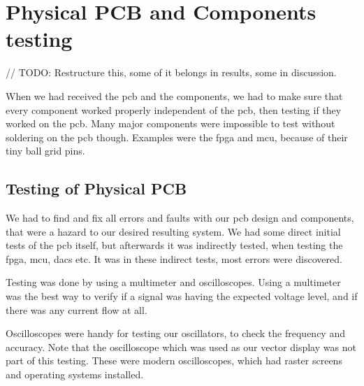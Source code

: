 \section{Physical PCB and Components testing}

// TODO: Restructure this, some of it belongs in results, some in discussion.

When we had received the \gls{pcb} and the components, we had to make sure that every component worked properly independent of the \gls{pcb}, then testing if they worked on the \gls{pcb}. Many major components were impossible to test without soldering on the \gls{pcb} though. Examples were the \gls{fpga} and \gls{mcu}, because of their tiny ball grid pins.

\subsection{Testing of Physical PCB}
We had to find and fix all errors and faults with our \gls{pcb} design and components, that were a hazard to our desired resulting system.  
We had some direct initial tests of the \gls{pcb} itself, but afterwards it was indirectly tested, when testing the \gls{fpga}, \gls{mcu}, \gls{dac}s etc. It was in these indirect tests, most errors were discovered.

Testing was done by using a multimeter and oscilloscopes. Using a multimeter was the best way to verify if a signal was having the expected voltage level, and if there was any current flow at all.

Oscilloscopes were handy for testing our oscillators, to check the frequency and accuracy. Note that the oscilloscope which was used as our vector display was not part of this testing. These were modern oscilloscopes, which had raster screens and operating systems installed.

